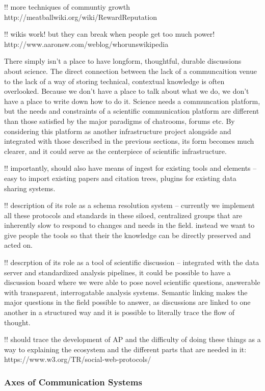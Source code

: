 \documentclass[10pt]{article}
\begin{document}
\begin{multicols}{2}
!! more techniques of communtiy growth
http://meatballwiki.org/wiki/RewardReputation

!! wikis work! but they can break when people get too much power!
http://www.aaronsw.com/weblog/whorunswikipedia

There simply isn't a place to have longform, thoughtful, durable
discussions about science. The direct connection between the lack of a
communcaition venue to the lack of a way of storing technical,
contextual knowledge is often overlooked. Because we don't have a place
to talk about what we do, we don't have a place to write down how to do
it. Science needs a communcation platform, but the needs and constraints
of a scientific communication platform are different than those
satisfied by the major paradigms of chatrooms, forums etc. By
considering this platform as another infrastructure project alongside
and integrated with those described in the previous sections, its form
becomes much clearer, and it could serve as the centerpiece of
scientific infrastructure.

!! importantly, should also have means of ingest for existing tools and
elements -- easy to import existing papers and citation trees, plugins
for existing data sharing systems.

!! description of its role as a schema resolution system -- currently we
implement all these protocols and standards in these siloed, centralized
groups that are inherently slow to respond to changes and needs in the
field. instead we want to give people the tools so that their the
knowledge can be directly preserved and acted on.

!! descrption of its role as a tool of scientific discussion --
integrated with the data server and standardized analysis pipelines, it
could be possible to have a discussion board where we were able to pose
novel scientific questions, answerable with transparent, interrogatable
analysis systems. Semantic linking makes the major questions in the
field possible to answer, as discussions are linked to one another in a
structured way and it is possible to literally trace the flow of
thought.

!! should trace the development of AP and the difficulty of doing these
things as a way to explaining the ecosystem and the different parts that
are needed in it: https://www.w3.org/TR/social-web-protocols/

\hypertarget{axes-of-communication-systems}{%
\subsubsection{Axes of Communication
Systems}\label{axes-of-communication-systems}}


\end{multicols}
\end{document}
